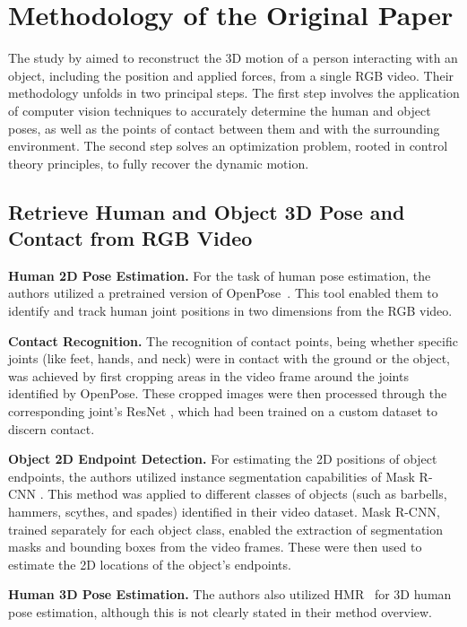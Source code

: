 \section{Methodology of the Original Paper}
\label{sec:methodo_paper}

The study by \citet{li2019estimating} aimed to reconstruct the 3D motion of a person interacting with an object, including the position 
and applied forces, from a single RGB video. Their methodology unfolds in two principal steps. The first step involves the application of 
computer vision techniques to accurately determine the human and object poses, as well as the points of contact between them and with the 
surrounding environment. The second step solves an optimization problem, rooted in control theory principles, to fully recover 
the dynamic motion.  


\subsection{Retrieve Human and Object 3D Pose and Contact from RGB Video}
\label{subsec:retrieve_original}

\noindent\textbf{Human 2D Pose Estimation.}\label{2dpose} For the task of human pose estimation, the authors utilized a pretrained version of 
OpenPose~\cite{cao2017realtime}. This tool enabled them to identify and track human joint positions in two dimensions from the RGB video.

\noindent\textbf{Contact Recognition.} The recognition of contact points, being whether specific joints (like feet, hands, and neck) were in 
contact with the ground or the object, was achieved by first cropping areas in the video frame around the joints identified by OpenPose. 
These cropped images were then processed through the corresponding joint's ResNet \cite{he2016deep}, which had been trained on a custom dataset 
to discern contact.

\noindent\textbf{Object 2D Endpoint Detection.} For estimating the 2D positions of object endpoints, the authors utilized instance segmentation 
capabilities of Mask R-CNN \cite{he2017mask}. This method was applied to different classes of objects (such as barbells, hammers, scythes, 
and spades) identified in their video dataset. Mask R-CNN, trained separately for each object class, enabled the extraction of segmentation masks
and bounding boxes from the video frames. These were then used to estimate the 2D locations of the object's endpoints.

\noindent\textbf{Human 3D Pose Estimation.} The authors also utilized HMR~\cite{kanazawa2018end} for 3D human pose estimation, although this 
is not clearly stated in their method overview.



